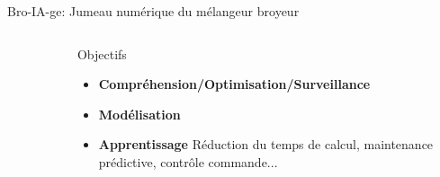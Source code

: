 \documentclass[aspectratio=169]{beamer} %
\begin{document}
\begin{frame}{Bro-IA-ge: Jumeau numérique du mélangeur broyeur}
\begin{columns}[t]
\begin{column}{0.45\textwidth}
\begin{figure}
            \end{figure}
        \end{column}
        \begin{column}{0.55\textwidth}
            \begin{block}{Objectifs}
                \begin{itemize}
                    \item \textbf{Compréhension/Optimisation/Surveillance}
                    \item \textbf{Modélisation}
                    \item \textbf{Apprentissage}
                          Réduction du temps de calcul, maintenance prédictive, contrôle commande...
                \end{itemize}
            \end{block}
        \end{column}
    \end{columns}
\end{frame}
\end{document}
